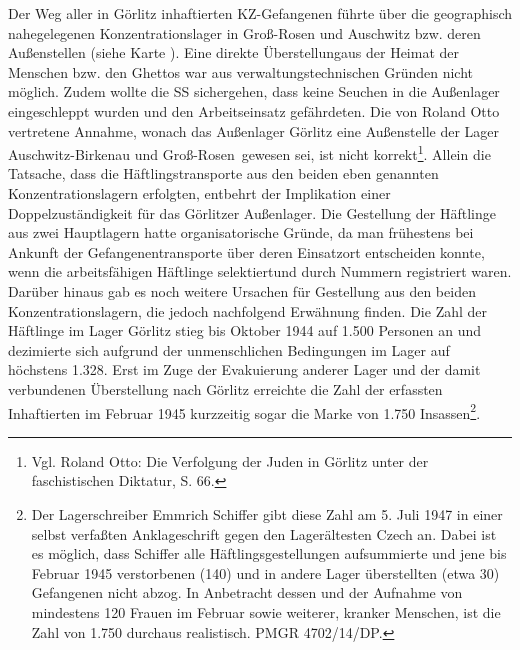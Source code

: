\documentclass[a4paper,12pt,ngerman,
]{nisebook}
\begin{document}
Der Weg aller in Görlitz inhaftierten KZ-Gefangenen führte über die geographisch nahegelegenen Konzentrationslager in Groß-Rosen und Auschwitz bzw. deren Außenstellen (siehe Karte ). Eine direkte \glqq Überstellung\grqq aus der Heimat der Menschen bzw. den Ghettos war aus verwaltungstechnischen Gründen nicht möglich. Zudem wollte die SS sichergehen, dass keine Seuchen in die Außenlager eingeschleppt wurden und den Arbeitseinsatz gefährdeten.
\newline
Die von Roland Otto vertretene Annahme, wonach das Außenlager Görlitz eine \glqq Außenstelle der Lager Auschwitz-Birkenau und Groß-Rosen\grqq~gewesen sei, ist nicht korrekt\footnote{Vgl. Roland Otto: Die Verfolgung der Juden in Görlitz unter der faschistischen Diktatur, S. 66.}. Allein die Tatsache, dass die Häftlingstransporte aus den beiden eben genannten Konzentrationslagern erfolgten, entbehrt der Implikation einer Doppelzuständigkeit für das Görlitzer Außenlager.
\newline
Die Gestellung der Häftlinge aus zwei Hauptlagern hatte organisatorische Gründe, da man frühestens bei Ankunft der Gefangenentransporte über deren Einsatzort entscheiden konnte, wenn die arbeitsfähigen Häftlinge \glqq selektiert\grqq und durch Nummern registriert waren. Darüber hinaus gab es noch weitere Ursachen für Gestellung aus den beiden Konzentrationslagern, die jedoch nachfolgend Erwähnung finden.
\newline
Die Zahl der Häftlinge im Lager Görlitz stieg bis Oktober 1944 auf 1.500 Personen an und dezimierte sich aufgrund der unmenschlichen Bedingungen im Lager auf höchstens 1.328. Erst im Zuge der Evakuierung anderer Lager und der damit verbundenen Überstellung nach Görlitz erreichte die Zahl der erfassten Inhaftierten im Februar 1945 kurzzeitig sogar die Marke von 1.750 Insassen\footnote{Der Lagerschreiber Emmrich Schiffer gibt diese Zahl am 5. Juli 1947 in einer selbst verfaßten Anklageschrift gegen den Lagerältesten Czech an. Dabei ist es möglich, dass Schiffer alle Häftlingsgestellungen aufsummierte und jene bis Februar 1945 verstorbenen (140) und in andere Lager überstellten (etwa 30) Gefangenen nicht abzog. In Anbetracht dessen und der Aufnahme von mindestens 120 Frauen im Februar sowie weiterer, kranker Menschen, ist die Zahl von 1.750 durchaus realistisch. PMGR 4702/14/DP.}.

\end{document}
